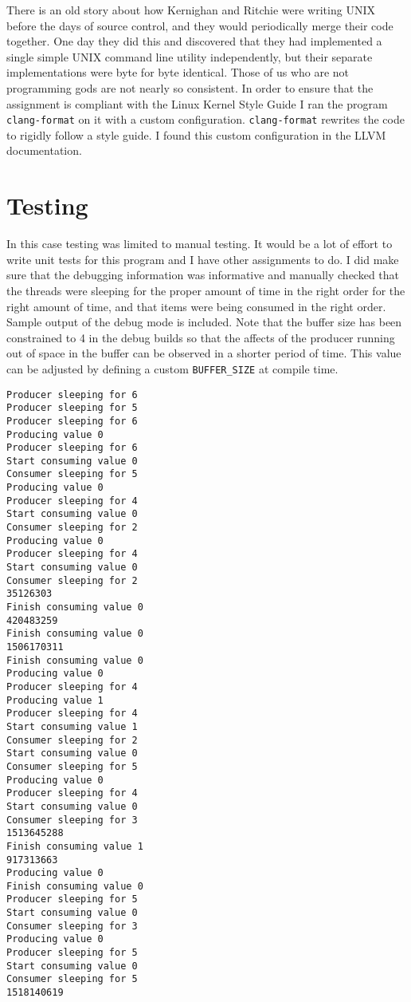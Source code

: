 \documentclass[10pt,conference,draftclsnofoot,onecolumn]{IEEEtran}
\begin{document}
There is an old story about how Kernighan and Ritchie were writing UNIX before the days of source control, and they would periodically merge their code together. One day they did this and discovered that they had implemented a single simple UNIX command line utility independently, but their separate implementations were byte for byte identical. Those of us who are not programming gods are not nearly so consistent. In order to ensure that the assignment is compliant with the Linux Kernel Style Guide I ran the program \texttt{clang-format} on it with a custom configuration. \texttt{clang-format} rewrites the code to rigidly follow a style guide. I found this custom configuration in the LLVM documentation.

\section{Testing}
In this case testing was limited to manual testing. It would be a lot of effort to write unit tests for this program and I have other assignments to do. I did make sure that the debugging information was informative and manually checked that the threads were sleeping for the proper amount of time in the right order for the right amount of time, and that items were being consumed in the right order. Sample output of the debug mode is included. Note that the buffer size has been constrained to 4 in the debug builds so that the affects of the producer running out of space in the buffer can be observed in a shorter period of time. This value can be adjusted by defining a custom \texttt{BUFFER\_SIZE} at compile time.


\begin{verbatim}
Producer sleeping for 6
Producer sleeping for 5
Producer sleeping for 6
Producing value 0
Producer sleeping for 6
Start consuming value 0
Consumer sleeping for 5
Producing value 0
Producer sleeping for 4
Start consuming value 0
Consumer sleeping for 2
Producing value 0
Producer sleeping for 4
Start consuming value 0
Consumer sleeping for 2
35126303
Finish consuming value 0
420483259
Finish consuming value 0
1506170311
Finish consuming value 0
Producing value 0
Producer sleeping for 4
Producing value 1
Producer sleeping for 4
Start consuming value 1
Consumer sleeping for 2
Start consuming value 0
Consumer sleeping for 5
Producing value 0
Producer sleeping for 4
Start consuming value 0
Consumer sleeping for 3
1513645288
Finish consuming value 1
917313663
Producing value 0
Finish consuming value 0
Producer sleeping for 5
Start consuming value 0
Consumer sleeping for 3
Producing value 0
Producer sleeping for 5
Start consuming value 0
Consumer sleeping for 5
1518140619
\end{verbatim}
\end{document}
